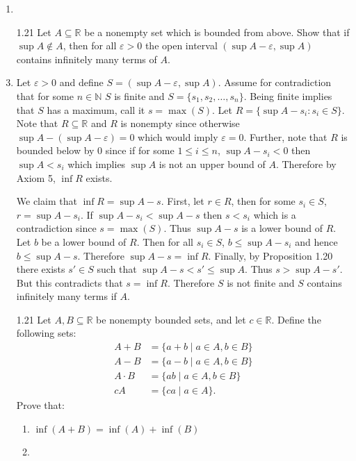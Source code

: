 \documentclass[12pt]{article}
\makeatletter
\theoremstyle{definition}
\theoremstyle{remark}
\renewenvironment{proof}[1][\proofname]{\par
  \pushQED{\qed}%
  \normalfont \topsep6\p@\@plus6\p@\relax
  \list{}{\leftmargin=0mm
          \rightmargin=4mm
          \settowidth{\itemindent}{\itshape#1}%
          \labelwidth=\itemindent
          \parsep=0pt \listparindent=\parindent 
  }
  \item[\hskip\labelsep
        \itshape
    #1\@addpunct{.}]\ignorespaces
}{%
  \popQED\endlist\@endpefalse
}
\let\oldproofname=\proofname
\renewcommand{\proofname}{\bf{\textit{\oldproofname}}}
\makeatother
\begin{document}
\begin{enumerate}[leftmargin=*]
\begin{proof}
            \end{proof}
        \item[1.21] Let $A\subseteq\mathbb{R}$ be a nonempty set which is bounded from above. Show that if $\sup A\notin A$, then for all $\varepsilon>0$ the open interval $(\sup A-\varepsilon,\sup A)$ contains infinitely many terms of $A$.
            \begin{proof}
                Let $\varepsilon>0$ and define $S=(\sup A-\varepsilon,\sup A)$. Assume for contradiction that for some $n\in\mathbb{N}$ $S$ is finite and $S=\{s_1,s_2,\dots,s_n\}$. Being finite implies that $S$ has a maximum, call it $s=\max(S)$. Let $R=\{\sup A-s_i: s_i\in S\}$. Note that $R\subseteq\mathbb{R}$ and $R$ is nonempty since otherwise $\sup A-(\sup A-\varepsilon)=0$ which would imply $\varepsilon=0$. Further, note that $R$ is bounded below by 0 since if for some $1\leq i\leq n$, $\sup A-s_i<0$ then $\sup A<s_i$ which implies $\sup A$ is not an upper bound of $A$. Therefore by Axiom 5, $\inf R$ exists.\par\hspace{4mm} We claim that $\inf R=\sup A-s$. First, let $r\in R$, then for some $s_i\in S$, $r=\sup A-s_i$. If $\sup A-s_i<\sup A-s$ then $s<s_i$ which is a contradiction since $s=\max(S)$. Thus $\sup A-s$ is a lower bound of $R$. Let $b$ be a lower bound of $R$. Then for all $s_i\in S$, $b\leq\sup A-s_i$ and hence $b\leq\sup A-s$. Therefore $\sup A-s=\inf R$. Finally, by Proposition 1.20 there exists $s'\in S$ such that $\sup A-s<s'\leq\sup A$. Thus $s>\sup A-s'$. But this contradicts that $s=\inf R$. Therefore $S$ is not finite and $S$ contains infinitely many terms if $A$.
            \end{proof}
        \item[1.21] Let $A,B\subseteq\mathbb{R}$ be nonempty bounded sets, and let $c\in\mathbb{R}$. Define the following sets:
            \begin{align*}
                A+B&=\{a+b\mid a\in A,b\in B\} \\ A-B&=\{a-b\mid a\in A,b\in B\} \\ A\cdot B&=\{ab\mid a\in A,b\in B\} \\cA&=\{ca\mid a\in A\}.
            \end{align*}
        Prove that:
            \begin{enumerate}[label=(\arabic*)]
                \item $\inf(A+B)=\inf(A)+\inf(B)$ 
                    \begin{proof}

\end{proof}
\end{enumerate}
\end{enumerate}
\end{document}
